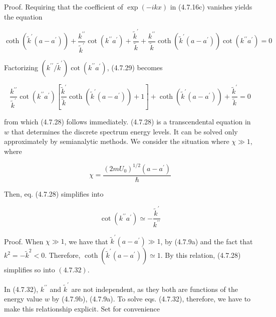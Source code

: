 \documentclass{article}
\begin{document}
Proof. Requiring that the coefficient of $\exp (-i k x)$ in (4.7.16c) vanishes yields the equation
 
\begin{equation*}
\operatorname{coth}\left(\tilde{k}^{\prime}\left(a-a^{\prime}\right)\right)+\frac{k^{\prime \prime}}{\tilde{k}^{\prime}} \cot \left(k^{\prime \prime} a^{\prime}\right)+\frac{\tilde{k}^{\prime}}{\tilde{k}}+\frac{k^{\prime \prime}}{\tilde{k}} \operatorname{coth}\left(\tilde{k}^{\prime}\left(a-a^{\prime}\right)\right) \cot \left(k^{\prime \prime} a^{\prime}\right)=0 \tag{4.7.29}
\end{equation*}
 

Factorizing $\left(k^{\prime \prime} / \tilde{k}^{\prime}\right) \cot \left(k^{\prime \prime} a^{\prime}\right)$, (4.7.29) becomes
 
\begin{equation*}
\frac{k^{\prime \prime}}{\tilde{k}^{\prime}} \cot \left(k^{\prime \prime} a^{\prime}\right)\left[\frac{\tilde{k}^{\prime}}{\tilde{k}} \operatorname{coth}\left(\tilde{k}^{\prime}\left(a-a^{\prime}\right)\right)+1\right]+\operatorname{coth}\left(\tilde{k}^{\prime}\left(a-a^{\prime}\right)\right)+\frac{\tilde{k}^{\prime}}{\tilde{k}}=0 \tag{4.7.30}
\end{equation*}
 
from which (4.7.28) follows immediately.
(4.7.28) is a transcendental equation in $w$ that determines the discrete spectrum energy levels. It can be solved only approximately by semianalytic methods. We consider the situation where $\chi \gg 1$, where
 
\begin{equation*}
\chi=\frac{\left(2 m U_{0}\right)^{1 / 2}\left(a-a^{\prime}\right)}{\hbar} \tag{4.7.31}
\end{equation*}
 

Then, eq. (4.7.28) simplifies into
 
\begin{equation*}
\cot \left(k^{\prime \prime} a^{\prime}\right) \simeq-\frac{\tilde{k}^{\prime}}{k^{\prime \prime}} \tag{4.7.32}
\end{equation*}
 

Proof. When $\chi \gg 1$, we have that $\tilde{k}^{\prime}\left(a-a^{\prime}\right) \gg 1$, by (4.7.9a) and the fact that $k^{2}=-\tilde{k}^{2}<0$. Therefore, $\operatorname{coth}\left(\tilde{k}^{\prime}\left(a-a^{\prime}\right)\right) \simeq 1$. By this relation, (4.7.28) simplifies so into $(4.7 .32)$.

In (4.7.32), $k^{\prime \prime}$ and $\tilde{k}^{\prime}$ are not independent, as they both are functions of the energy value $w$ by (4.7.9b), (4.7.9a). To solve eqs. (4.7.32), therefore, we have to make this relationship explicit. Set for convenience
 
\end{document}
